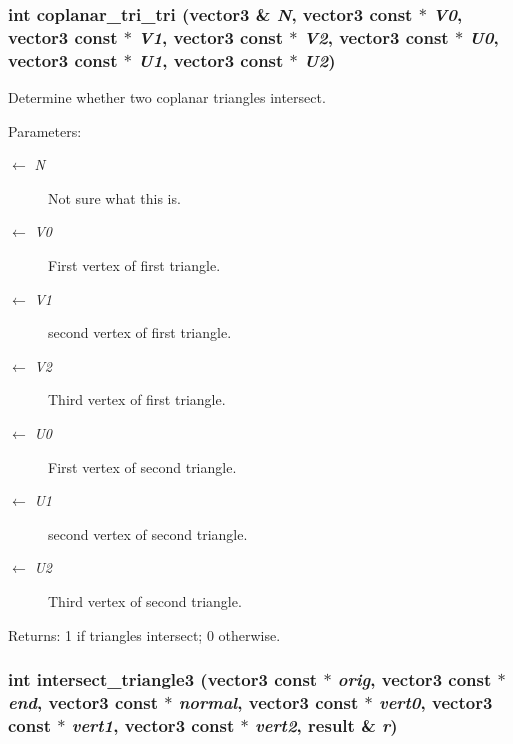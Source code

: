 \subsubsection{\setlength{\rightskip}{0pt plus 5cm}int coplanar\_\-tri\_\-tri ({\bf vector3} \& {\em N}, {\bf vector3} const $\ast$ {\em V0}, {\bf vector3} const $\ast$ {\em V1}, {\bf vector3} const $\ast$ {\em V2}, {\bf vector3} const $\ast$ {\em U0}, {\bf vector3} const $\ast$ {\em U1}, {\bf vector3} const $\ast$ {\em U2})}\label{opttritri_8cc_7cc10013bc791c2bfab4bb52a1a2809e}


Determine whether two coplanar triangles intersect. \begin{Desc}
\item[Parameters:]
\begin{description}
\item[\mbox{$\leftarrow$} {\em N}]Not sure what this is. \item[\mbox{$\leftarrow$} {\em V0}]First vertex of first triangle. \item[\mbox{$\leftarrow$} {\em V1}]second vertex of first triangle. \item[\mbox{$\leftarrow$} {\em V2}]Third vertex of first triangle. \item[\mbox{$\leftarrow$} {\em U0}]First vertex of second triangle. \item[\mbox{$\leftarrow$} {\em U1}]second vertex of second triangle. \item[\mbox{$\leftarrow$} {\em U2}]Third vertex of second triangle. \end{description}
\end{Desc}
\begin{Desc}
\item[Returns:]1 if triangles intersect; 0 otherwise. \end{Desc}
\subsubsection{\setlength{\rightskip}{0pt plus 5cm}int intersect\_\-triangle3 ({\bf vector3} const $\ast$ {\em orig}, {\bf vector3} const $\ast$ {\em end}, {\bf vector3} const $\ast$ {\em normal}, {\bf vector3} const $\ast$ {\em vert0}, {\bf vector3} const $\ast$ {\em vert1}, {\bf vector3} const $\ast$ {\em vert2}, {\bf result} \& {\em r})}\label{opttritri_8cc_d7a9482aa12886f663ad07d306fe8ccb}


